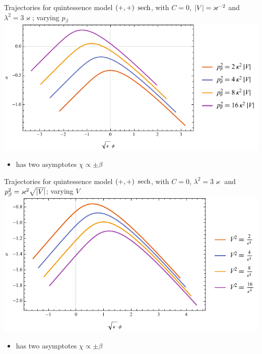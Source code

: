 \documentclass[9pt]{beamer}
\begin{document}
\begin{frame}%
{Trajectories for quintessence model ${\left(+,+\right)}$}%
{$\operatorname{sech}$, with $C = 0$, ${\left|V\right|} = \varkappa^{-2}$ and
$\lambda^2 = 3\varkappa$; varying $p_\beta$}
\includegraphics[width=\textwidth]{./plots.nb/sech_pbet.pdf}
\begin{itemize}
	\item has two asymptotes $\chi \propto \pm \beta$
\end{itemize}
\end{frame}

\begin{frame}%
{Trajectories for quintessence model ${\left(+,+\right)}$}%
{$\operatorname{sech}$, with $C = 0$, $\lambda^2 = 3\varkappa$ and
$p_\beta^2 = \varkappa^2\sqrt{{\left|V\right|}}$; varying $V$}
\includegraphics[width=\textwidth]{./plots.nb/sech_Vsqr.pdf}
\begin{itemize}
	\item has two asymptotes $\chi \propto \pm \beta$
\end{itemize}
\end{frame}

\end{document}
